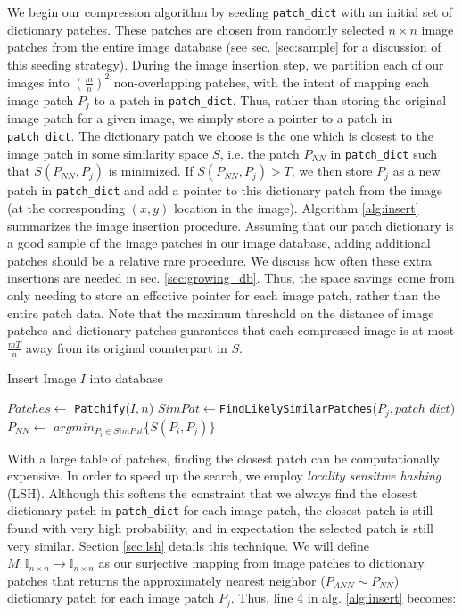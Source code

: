We begin our compression algorithm by seeding \texttt{patch\_dict} with an initial set of dictionary patches.  These patches are chosen from randomly selected $n \times n$ image patches from the entire image database (see sec. \ref{sec:sample} for a discussion of this seeding strategy).   During the image insertion step, we partition each of our images into $\left(\frac{m}{n}\right)^2$ non-overlapping patches, with the intent of mapping each image patch $P_j$ to a patch in \texttt{patch\_dict}.  Thus, rather than storing the original image patch for a given image, we simply store a pointer to a patch in \texttt{patch\_dict}.  The dictionary patch we choose is the one which is closest to the image patch in some similarity space $S$, i.e. the patch $P_{NN}$ in \texttt{patch\_dict} such that $S(P_{NN}, P_j)$ is minimized.  If $S(P_{NN}, P_j) > T$, we then store $P_j$ as a new patch in \texttt{patch\_dict} and add a pointer to this dictionary patch from the image (at the corresponding $(x,y)$ location in the image).  Algorithm \ref{alg:insert} summarizes the image insertion procedure. Assuming that our patch dictionary is a good sample of the image patches in our image database, adding additional patches should be a relative rare procedure.  We discuss how often these extra insertions are needed in sec. \ref{sec:growing_db}. Thus, the space savings come from only needing to store an effective pointer for each image patch, rather than the entire patch data.  Note that the maximum threshold on the distance of image patches and dictionary patches guarantees that each compressed image is at most $\frac{mT}{n}$ away from its original counterpart in $S$.  

\begin{algorithm}
    \caption{Insert Image $I$ into database}
    \label{alg:insert}
\begin{algorithmic}[1]
\State $Patches \leftarrow $ \texttt{Patchify}($I,n$)
\State $SimPat \leftarrow $\texttt{FindLikelySimilarPatches}($P_j,patch\_dict$)
\State $P_{NN} \leftarrow $ $argmin_{P_i \in SimPat} \{ S(P_i, P_j) \}$
\EndIf
\EndFor
\vspace{3mm}
\end{algorithmic}
\label{insert_algorithm}
\end{algorithm}

With a large table of patches, finding the closest patch can be computationally expensive.  In order to speed up the search, we employ \emph{locality sensitive hashing} (LSH).  Although this softens the constraint that we always find the closest dictionary patch in \texttt{patch\_dict} for each image patch, the closest patch is still found with very high probability, and in expectation the selected patch is still very similar.  Section \ref{sec:lsh} details this technique. We will define $M \colon \mathds{I}_{n \times n}  \to \mathds{I}_{n \times n}$ as our surjective mapping from image patches to dictionary patches that returns the approximately nearest neighbor ($P_{ANN}  \sim P_{NN}$) dictionary patch for each image patch $P_j$. Thus, line 4 in alg. \ref{alg:insert} becomes: 

